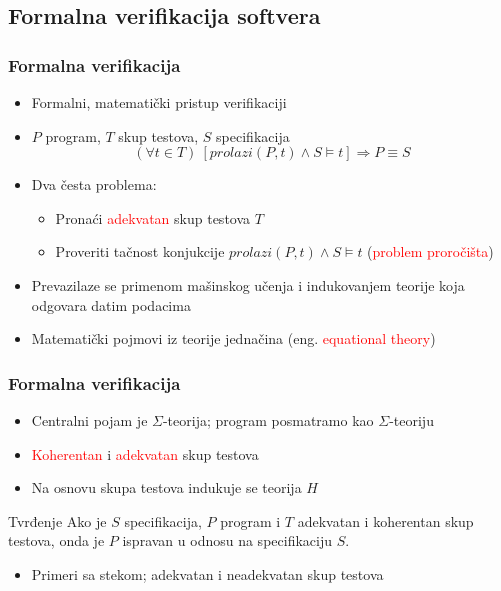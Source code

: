 \documentclass[11pt]{beamer}
\theoremstyle{definition}
\begin{document}
{\subsection{Formalna verifikacija softvera}
\label{subsec:formalna-verifikacija}
\begin{frame}
\frametitle{Formalna verifikacija}
\begin{itemize}
\item Formalni, matematički pristup verifikaciji
\item $P$ program, $T$ skup testova, $S$ specifikacija
$$(\forall t\in T)\ [prolazi(P,t)\wedge S\models t]\Rightarrow P\equiv S$$
\item Dva česta problema:
	\begin{itemize}
	\item Pronaći \textcolor{red}{adekvatan} skup testova $T$
	\item Proveriti tačnost konjukcije $prolazi(P,t)\wedge S\models t$ (\textcolor{red}{problem proročišta})
	\end{itemize}
\item Prevazilaze se primenom mašinskog učenja i indukovanjem teorije koja odgovara datim podacima
\item Matematički pojmovi iz teorije jednačina (eng. \textcolor{red}{equational theory})
\end{itemize}
\end{frame}

\begin{frame}
\frametitle{Formalna verifikacija}
\begin{itemize}
\item Centralni pojam je $\Sigma$-teorija; program posmatramo kao $\Sigma$-teoriju
\item \textcolor{red}{Koherentan} i \textcolor{red}{adekvatan} skup testova
\item Na osnovu skupa testova indukuje se teorija $H$
\end{itemize}

\begin{block}{Tvrđenje}
Ako je $S$ specifikacija, $P$ program i $T$ adekvatan i koherentan skup testova, onda je $P$ ispravan u odnosu na specifikaciju $S$.
\end{block}

\begin{itemize}
\item Primeri sa stekom; adekvatan i neadekvatan skup testova
\end{itemize}
\end{frame}


}
\end{document}
